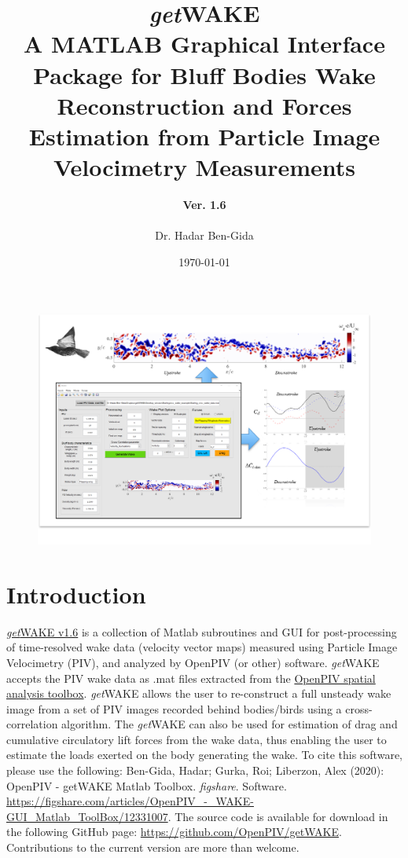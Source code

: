 \documentclass[12pt,a4paper]{article}
\title{\textbf{{\Huge \textit{get}WAKE} \\ A MATLAB Graphical Interface Package for Bluff Bodies Wake Reconstruction and Forces Estimation from Particle Image Velocimetry Measurements \newline {} \newline {\Huge User's Manual}}}
\author{
	\textbf{Ver. 1.6}\\
	\\
	Dr. Hadar Ben-Gida
}
\date{\today}
\begin{document}
\ifpdf
\graphicspath{{Images/}}
\fi

\maketitle
\thispagestyle{empty}

\vspace{10mm} %

\begin{figure}[ht!]
	\centering
	\includegraphics[width=\textwidth]{getWAKE-Overview}
	\label{fig:getWAKE-Overview}
\end{figure}	

\newpage

\tableofcontents

\newpage


\section{Introduction}\label{Intro}

\href{https://github.com/OpenPIV/getWAKE}{\textit{get}WAKE v1.6} is a collection of Matlab subroutines and GUI for post-processing of time-resolved wake data (velocity vector maps) measured using Particle Image Velocimetry (PIV), and analyzed by OpenPIV (or other) software. 
\textit{get}WAKE accepts the PIV wake data as .mat files extracted from the \href{https://github.com/OpenPIV/openpiv-spatial-analysis-toolbox}{OpenPIV spatial analysis toolbox}.
\textit{get}WAKE allows the user to re-construct a full unsteady wake image from a set of PIV images recorded behind bodies/birds using a cross-correlation algorithm.
The \textit{get}WAKE can also be used for estimation of drag and cumulative circulatory lift forces from the wake data, thus enabling the user to estimate the loads exerted on the body generating the wake. 
To cite this software, please use the following:
Ben-Gida, Hadar; Gurka, Roi; Liberzon, Alex (2020): OpenPIV - getWAKE Matlab Toolbox. \textit{figshare}. Software. \url{https://figshare.com/articles/OpenPIV_-_WAKE-GUI_Matlab_ToolBox/12331007}. The source code is available for download in the following GitHub page: \url{https://github.com/OpenPIV/getWAKE}. Contributions to the current version are more than welcome.
\end{document}
